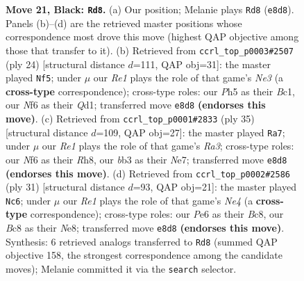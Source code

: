 \documentclass[11pt]{article}
\begin{document}
\begin{figure}[p]
\caption{\textbf{Move 21, Black: \texttt{Rd8}.} (a) Our position; Melanie plays \texttt{Rd8} (\texttt{e8d8}). Panels (b)--(d) are the retrieved master positions whose correspondence most drove this move (highest QAP objective among those that transfer to it). (b) Retrieved from \texttt{ccrl\_top\_p0003\#2507} (ply 24) [structural distance $d$=111, QAP obj=31]: the master played \texttt{Nf5}; under $\mu$ our \emph{Re1} plays the role of that game's \emph{Ne3} (a \textbf{cross-type} correspondence); cross-type roles: our \emph{P}h5 as their \emph{B}c1, our \emph{N}f6 as their \emph{Q}d1; transferred move \texttt{e8d8} \textbf{(endorses this move)}. (c) Retrieved from \texttt{ccrl\_top\_p0001\#2833} (ply 35) [structural distance $d$=109, QAP obj=27]: the master played \texttt{Ra7}; under $\mu$ our \emph{Re1} plays the role of that game's \emph{Ra3}; cross-type roles: our \emph{N}f6 as their \emph{R}h8, our \emph{b}b3 as their \emph{N}e7; transferred move \texttt{e8d8} \textbf{(endorses this move)}. (d) Retrieved from \texttt{ccrl\_top\_p0002\#2586} (ply 31) [structural distance $d$=93, QAP obj=21]: the master played \texttt{Nc6}; under $\mu$ our \emph{Re1} plays the role of that game's \emph{Ne4} (a \textbf{cross-type} correspondence); cross-type roles: our \emph{P}e6 as their \emph{B}c8, our \emph{B}c8 as their \emph{N}e8; transferred move \texttt{e8d8} \textbf{(endorses this move)}. Synthesis: 6 retrieved analogs transferred to \texttt{Rd8} (summed QAP objective 158, the strongest correspondence among the candidate moves); Melanie committed it via the \texttt{search} selector.}
\label{fig:thought-m41}
\end{figure}

\clearpage
\end{document}
